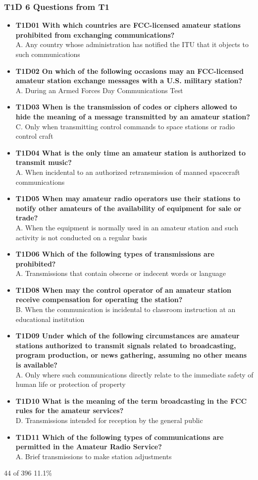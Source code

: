 \documentclass[10pt]{beamer}
\begin{document}
\begin{frame}
\frametitle{T1D 6 Questions from T1}
\begin{itemize}[<+->]
\tiny
\item\textbf{T1D01 With which countries are FCC-licensed amateur stations prohibited from exchanging communications?} \hfil\\A. Any country whose administration has notified the ITU that it objects to such communications
\item\textbf{T1D02 On which of the following occasions may an FCC-licensed amateur station exchange messages with a U.S. military station?} \hfil\\A. During an Armed Forces Day Communications Test
\item\textbf{T1D03 When is the transmission of codes or ciphers allowed to hide the meaning of a message transmitted by an amateur station?} \hfil\\C. Only when transmitting control commands to space stations or radio control craft
\item\textbf{T1D04 What is the only time an amateur station is authorized to transmit music?} \hfil\\A. When incidental to an authorized retransmission of manned spacecraft communications
\item\textbf{T1D05 When may amateur radio operators use their stations to notify other amateurs of the availability of equipment for sale or trade?} \hfil\\A. When the equipment is normally used in an amateur station and such activity is not conducted on a regular basis
\item\textbf{T1D06 Which of the following types of transmissions are prohibited? }\hfil\\A. Transmissions that contain obscene or indecent words or language
\item\textbf{T1D08 When may the control operator of an amateur station receive compensation for operating the station?} \hfil\\B. When the communication is incidental to classroom instruction at an educational institution
\item\textbf{T1D09 Under which of the following circumstances are amateur stations authorized to transmit signals related to broadcasting, program production, or news gathering, assuming no other means is available?}\hfil\\ A. Only where such communications directly relate to the immediate safety of human life or protection of property
\item\textbf{T1D10 What is the meaning of the term broadcasting in the FCC rules for the amateur services?} \hfil\\D. Transmissions intended for reception by the general public
\item\textbf{T1D11 Which of the following types of communications are permitted in the Amateur Radio Service?} \hfil\\A. Brief transmissions to make station adjustments
\end{itemize}
\tiny 44 of 396 11.1\%
\end{frame}
\end{document}
